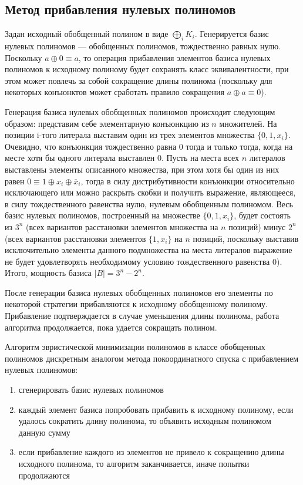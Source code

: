 \documentclass[a4paper,12pt,titlepage,finall]{article}
\begin{document}
\subsection{Метод прибавления нулевых полиномов}

Задан исходный обобщенный полином в виде $ \bigoplus\limits_i K_i $. Генерируется базис нулевых полиномов --- обобщенных полиномов, тождественно равных нулю. Поскольку $ a \oplus 0 \equiv a $, то операция прибавления элементов базиса нулевых полиномов к исходному полиному будет сохранять класс эквивалентности, при этом может повлечь за собой сокращение длины полинома (поскольку для некоторых конъюнктов может сработать правило сокращения $ a \oplus a \equiv 0 $).

Генерация базиса нулевых обобщенных полиномов происходит следующим образом: представим себе элементарную конъюнкцию из $ n $ множителей. На позиции i-того литерала выставим один из трех элементов множества $ \{ 0, 1, x_i \} $. Очевидно, что конъюнкция тождественно равна 0 тогда и только тогда, когда на месте хотя бы одного литерала выставлен 0. Пусть на места всех $ n $ литералов выставлены элементы описанного множества, при этом хотя бы один из них равен $ 0 \equiv 1 \oplus x_i \oplus \overline x_i $, тогда в силу дистрибутивности конъюнкции относительно исключающего или можно раскрыть скобки и получить выражение, являющееся, в силу тождественного равенства нулю, нулевым обобщенным полиномом. Весь базис нулевых полиномов, построенный на множестве $ \{ 0, 1, x_i \} $, будет состоять из $ 3^n $ (всех вариантов расстановки элементов множества на $ n $ позиций) минус $ 2^n $ (всех вариантов расстановки элементов $ \{ 1, x_i \} $ на $ n $ позиций, поскольку выставив исключительно элементы данного подмножества на места литералов выражение не будет удовлетворять необходимому условию тождественного равенства 0). Итого, мощность базиса $ \left| B \right| = 3^n - 2^n. $

После генерации базиса нулевых обобщенных полиномов его элементы по некоторой стратегии прибавляются к исходному обобщенному полиному. Прибавление подтверждается в случае уменьшения длины полинома, работа алгоритма продолжается, пока удается сокращать полином.

Алгоритм эвристической минимизации полиномов в классе обобщенных полиномов дискретным аналогом метода покоординатного спуска с прибавлением нулевых полиномов:
\begin{enumerate}
    \item сгенерировать базис нулевых полиномов
    \item каждый элемент базиса попробовать прибавить к исходному полиному, если удалось сократить длину полинома, то объявить исходным полиномом данную сумму
    \item если прибавление каждого из элементов не привело к сокращению длины исходного полинома, то алгоритм заканчивается, иначе попытки продолжаются
\end{enumerate}
\end{document}
